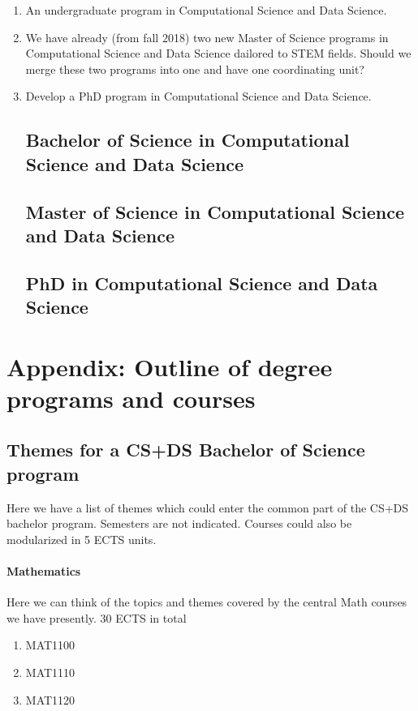 \documentclass[oneside,final,10pt]{article}
\begin{document}
\begin{enumerate}
\item An undergraduate program in Computational Science and Data Science.

\item We have already (from fall 2018) two new Master of Science programs in Computational Science and Data Science dailored to STEM fields. Should we merge these two programs into one and have one coordinating unit? 

\item Develop a PhD program in Computational Science and Data Science.

\subsection*{Bachelor of Science in Computational Science and Data Science}

\subsection*{Master of Science in Computational Science and Data Science}

\subsection*{PhD in Computational Science and Data Science}


\end{enumerate}










\section*{Appendix:  Outline of degree programs and courses}

\subsection*{Themes for a CS+DS Bachelor of Science program}

Here we have a list of themes which could enter the common part of the CS+DS bachelor program.  
Semesters are not indicated. Courses could also be modularized in 5 ECTS units.



\paragraph{Mathematics}
Here we can think of the topics and themes covered by the central  Math courses we have presently.
30 ECTS in total
\begin{enumerate}
\color{red}
    \item MAT1100
    \item MAT1110
    \item MAT1120
\end{enumerate}
\end{document}
